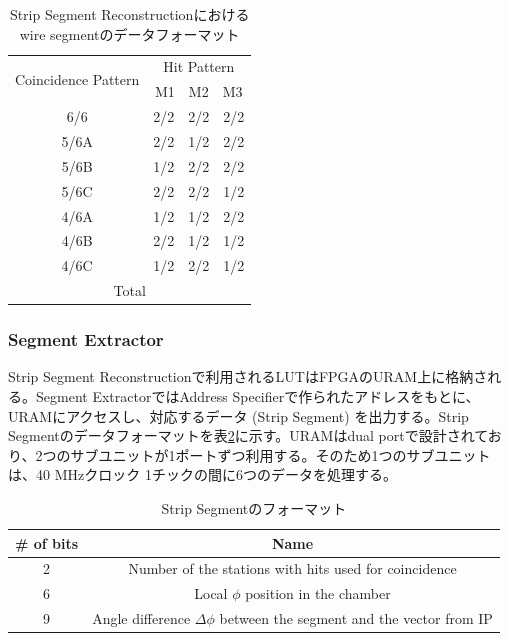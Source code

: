 \begin{table}[]
    \centering
    \caption{Strip Segment Reconstructionにおけるwire segmentのデータフォーマット}
    \label{tab:SegmentReco_strip}
    \begin{tabular}{|cc|}
    \hline
    \multicolumn{1}{|c|}{\multirow{2}{*}{Coincidence Pattern}} & Hit Pattern \\ \cline{2-2} 
    \multicolumn{1}{|c|}{}                                     & M1　M2　M3    \\ \hline\hline
    \multicolumn{1}{|c|}{6/6}                                  & 2/2　2/2　2/2 \\ \hline
    \multicolumn{1}{|c|}{5/6A}                                 & 2/2　1/2　2/2 \\ \hline
    \multicolumn{1}{|c|}{5/6B}                                 & 1/2　2/2　2/2 \\ \hline
    \multicolumn{1}{|c|}{5/6C}                                 & 2/2　2/2　1/2 \\ \hline
    \multicolumn{1}{|c|}{4/6A}                                 & 1/2　1/2　2/2 \\ \hline
    \multicolumn{1}{|c|}{4/6B}                                 & 2/2　1/2　1/2 \\ \hline
    \multicolumn{1}{|c|}{4/6C}                                 & 1/2　2/2　1/2 \\ \hline\hline
    \multicolumn{2}{|c|}{Total}                                              \\ \hline
    \end{tabular}
\end{table}

\subsubsection*{Segment Extractor}
Strip Segment Reconstructionで利用されるLUTはFPGAのURAM上に格納される。Segment ExtractorではAddress Specifierで作られたアドレスをもとに、URAMにアクセスし、対応するデータ (Strip Segment) を出力する。Strip Segmentのデータフォーマットを表\ref{tab:StripSegment}に示す。URAMはdual portで設計されており、2つのサブユニットが1ポートずつ利用する。そのため1つのサブユニットは、40 MHzクロック 1チックの間に6つのデータを処理する。

\begin{table}[]
    \centering
    \caption{Strip Segmentのフォーマット}
    \label{tab:StripSegment}
    \begin{tabular}{|c|c|}
    \hline
    \# of bits & Name                                                                     \\ \hline\hline
    2          & Number of the stations with hits used for coincidence                    \\ \hline
    6          & Local $\phi$ position in the chamber                                     \\ \hline
    9          & Angle difference $\Delta\phi$ between the segment and the vector from IP \\ \hline
    \end{tabular}
\end{table}

